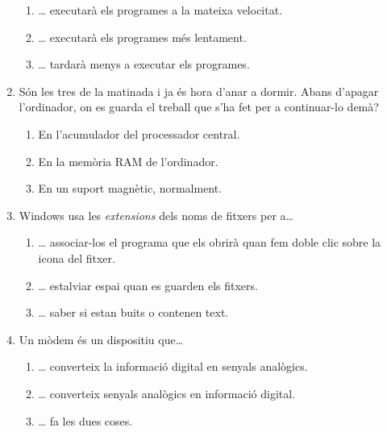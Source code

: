 \begin{enumerate}
\begin{enumerate}
\item {\ldots} executarà els programes a la mateixa velocitat.
\item {\ldots} executarà els programes més lentament.
\item {\ldots} tardarà menys a executar els programes.
\end{enumerate}
\item Són les tres de la matinada i ja és hora d'anar a
   dormir. Abans d'apagar l'ordinador, on es guarda el
   treball que s'ha fet per a continuar-lo demà?
   
\begin{enumerate}
\item En l'acumulador del processador central.
\item En la memòria RAM de l'ordinador.
\item En un suport magnètic, normalment.
\end{enumerate}

\item Windows usa les \emph{extensions} dels noms de fitxers per
   a{\ldots}
   
\begin{enumerate}
\item {\ldots} associar-los el programa que els obrirà quan
      fem doble clic sobre la icona del fitxer.
\item {\ldots} estalviar espai quan es guarden els fitxers.
\item {\ldots} saber si estan buits o contenen text.
\end{enumerate}
\item Un mòdem és un dispositiu que{\ldots}
   
\begin{enumerate}
\item {\ldots} converteix la informació digital en senyals analògics.
\item {\ldots} converteix senyals analògics en informació digital.
\item {\ldots} fa les dues coses.
\end{enumerate}


\end{enumerate}
